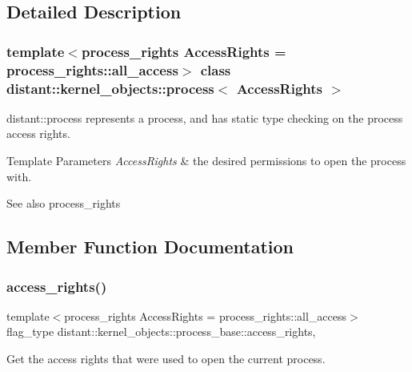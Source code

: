 \subsection{Detailed Description}
\subsubsection*{template$<$process\+\_\+rights Access\+Rights = process\+\_\+rights\+::all\+\_\+access$>$\newline
class distant\+::kernel\+\_\+objects\+::process$<$ Access\+Rights $>$}

distant\+::process represents a process, and has static type checking on the process access rights. 


\begin{DoxyTemplParams}{Template Parameters}
{\em Access\+Rights} & the desired permissions to open the process with. \\
\hline
\end{DoxyTemplParams}
\begin{DoxySeeAlso}{See also}
process\+\_\+rights 
\end{DoxySeeAlso}


\subsection{Member Function Documentation}
\mbox{\label{classdistant_1_1kernel__objects_1_1process_a28b2a7b7297714d4c7c4d320a0c4fbbc}} 
\subsubsection{\texorpdfstring{access\+\_\+rights()}{access\_rights()}}
{\footnotesize\ttfamily template$<$process\+\_\+rights Access\+Rights = process\+\_\+rights\+::all\+\_\+access$>$ \\
flag\+\_\+type distant\+::kernel\+\_\+objects\+::process\+\_\+base\+::access\+\_\+rights\hspace{0.3cm}{\ttfamily [inline]}, {\ttfamily [noexcept]}}



Get the access rights that were used to open the current process. 

